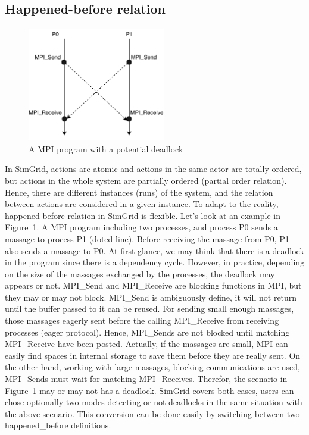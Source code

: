 \documentclass[a4paper,11pt]{article}
\theoremstyle{break}
\begin{document}
\subsection{Happened-before relation}
\begin{figure}[H]
	\label{fig:cycle_dependency}

		\centerline{\includegraphics[width=6cm,height=5cm]{Figures/mpiPro.pdf}}
	\caption{A MPI program with a potential deadlock}
\end{figure}
In SimGrid, actions are atomic and actions in the same actor are totally ordered, but actions in the whole system are partially ordered (partial order relation).  Hence, there are different instances (runs) of the system, and the relation between actions are  considered in a given instance. To adapt to the reality, happened-before relation in SimGrid is flexible. Let's look at an example in Figure~\ref{fig:cycle_dependency}. A MPI program including two processes, and process P0 sends a massage to process P1 (doted line). Before receiving  the massage from P0, P1 also sends a massage to P0. At first glance, we may think that there is a deadlock in the program since there is a dependency cycle. However, in practice, depending on the size of the massages exchanged by the processes, the deadlock may appears or not. MPI\_Send and MPI\_Receive are blocking functions in MPI, but they may or may not block. MPI\_Send is ambiguously define, it will not return until the buffer passed to it can be reused. For sending small enough massages, those massages eagerly sent before the calling MPI\_Receive from receiving processes (eager protocol). Hence, MPI\_Sends are not blocked until matching MPI\_Receive have been posted. Actually, if the massages are small, MPI can easily find spaces in internal storage to save them before they are really sent. On the other hand, working with large massages, blocking communications are used, MPI\_Sends must wait for matching MPI\_Receives. Therefor, the scenario in Figure~\ref{fig:cycle_dependency} may or may not has a deadlock. SimGrid covers both cases, users can chose optionally two modes detecting or not deadlocks in the same situation with the above scenario. This conversion can be done easily by switching between two happened\_before definitions.    
\end{document}
